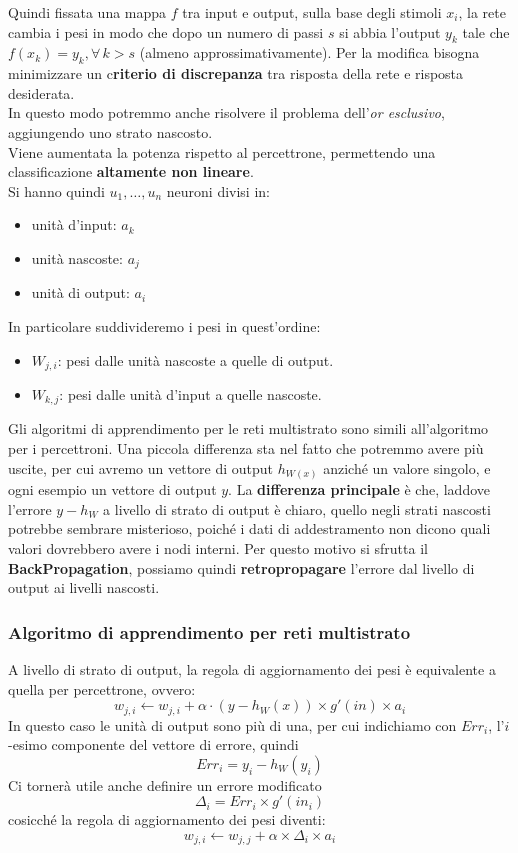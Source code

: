 						
						Quindi fissata una mappa $f$ tra input e output, sulla base degli stimoli $x_i$,
						la rete cambia i pesi in modo che dopo un numero di passi $s$ si abbia l'output
						$y_k$ tale che $f(x_k)=y_k,\forall\, k>s$ (almeno approssimativamente). Per la
						modifica bisogna minimizzare un c\textbf{riterio di discrepanza} tra risposta
						della rete e risposta desiderata.\\
						In questo modo potremmo anche risolvere il problema dell'\textit{or esclusivo},
						aggiungendo uno strato nascosto.\\
						Viene aumentata la potenza rispetto al percettrone, permettendo una
						classificazione \textbf{altamente non lineare}.\\
						Si hanno quindi $u_1,\ldots, u_n$ neuroni divisi in:
						\begin{itemize}
							\item unità d'input: $a_k$
							\item unità nascoste: $a_j$
							\item unità di output: $a_i$
						\end{itemize}
						In particolare suddivideremo i pesi in quest'ordine:
						\begin{itemize}
						    \item $W_{j,i}$: pesi dalle unità nascoste a quelle di output.
						    \item $W_{k,j}$: pesi dalle unità d'input a quelle nascoste.
						\end{itemize}
						Gli algoritmi di apprendimento per le reti multistrato sono simili all'algoritmo per i percettroni. Una piccola differenza sta nel fatto che potremmo avere più uscite, per cui avremo un vettore di output $h_{W(x)}$ anziché un valore singolo, e ogni esempio un vettore di output $y$. La \textbf{differenza principale} è che, laddove l'errore $y-h_W$ a livello di strato di output è chiaro, quello negli strati nascosti potrebbe sembrare misterioso, poiché i dati di addestramento non dicono quali valori dovrebbero avere i nodi interni. Per questo motivo si sfrutta il \textbf{BackPropagation}, possiamo quindi \textbf{retropropagare} l'errore dal livello di output ai livelli nascosti.
                        \subsubsection{Algoritmo di apprendimento per reti multistrato}						
						A livello di strato di output, la regola di aggiornamento dei pesi è equivalente a quella per percettrone, ovvero:
						\[w_{j,i}\gets w_{j,i}+\alpha\cdot(y-h_W(x))\times g'(in) \times a_i\]
                        In questo caso le unità di output sono più di una, per cui indichiamo con $Err_i$, l'$i$-esimo componente del vettore di errore, quindi \[Err_i = y_i - h_W(y_i)\] Ci tornerà utile anche definire un errore modificato \[\Delta_i = Err_i \times g'(in_i)\] cosicché la regola di aggiornamento dei pesi diventi:
                       	\[w_{j,i}\gets w_{j,j}+\alpha \times \Delta_i \times a_i\] 
					    
